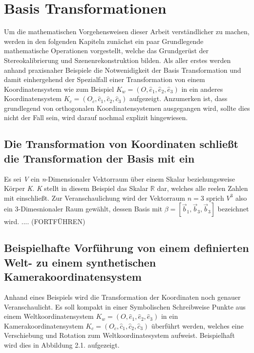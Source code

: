 \chapter{Basis Transformationen }

Um die mathematischen Vorgehensweisen dieser Arbeit verständlicher zu machen, werden in den folgenden Kapiteln zunächst ein paar Grundlegende mathematische Operationen vorgestellt, welche das Grundgerüst der Stereokalibrierung und Szenenrekonstruktion bilden. Als aller erstes werden anhand praxisnaher Beispiele die Notwenidigkeit der Basis Transformation und damit einhergehend der Spezialfall einer Transformation von einem Koordinatensystem wie zum Beispiel \ensuremath{K_w = (O,\hat{e}_1,\hat{e}_2,\hat{e}_3)} in ein anderes Koordinatensystem  \ensuremath{K_c=(O_c, \hat{c}_1, \hat{c}_2, \hat{c}_3)} aufgezeigt. Anzumerken ist, dass grundlegend von orthogonalen Koordinatensystemen ausgegangen wird, sollte dies nicht der Fall sein, wird darauf nochmal explizit hingewiesen.\\

\section{Die Transformation von Koordinaten schließt die Transformation der Basis mit ein}

Es sei \textit{V} ein \textit{n}-Dimensionaler Vektorraum über einem Skalar beziehungsweise Körper \textit{K}. \textit{K} stellt in diesem Beispiel das Skalar \ensuremath{\mathbb{R}} dar, welches alle reelen Zahlen mit einschließt. Zur Veranschaulichung wird der Vektorraum \ensuremath{n=3} sprich \ensuremath{V^3} also ein 3-Dimesnionaler Raum gewählt, dessen Basis mit \ensuremath{\beta = [\vec{b}_1, \vec{b}_3, \vec{b}_3]} bezeichnet wird.\cite{Elements} ....  (FORTFÜHREN)


\section{Beispielhafte Vorführung von einem definierten Welt- zu einem synthetischen Kamerakoordinatensystem}

Anhand eines Beispiels wird die Transformation der Koordinaten noch genauer Veranschaulicht. Es soll kompakt in einer Symbolischen Schreibweise Punkte aus einem Weltkoordinatensystem  \ensuremath{K_w = (O,\hat{e}_1,\hat{e}_2,\hat{e}_3)} in ein Kamerakoordinatensystem \ensuremath{K_c=(O_c, \hat{c}_1, \hat{c}_2, \hat{c}_3)} überführt werden, welches eine Verschiebung und Rotation zum Weltkoordinatesystem aufweist. Beispielhaft wird dies in Abbildung 2.1. aufgezeigt.
 
